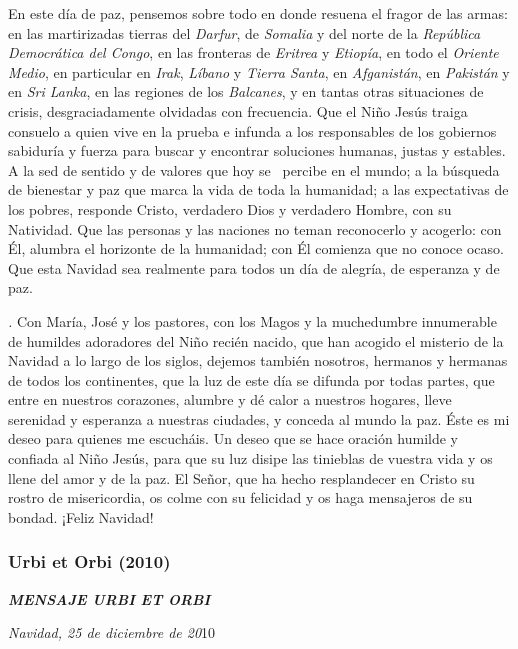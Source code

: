 En este día de paz, pensemos sobre todo en donde resuena el fragor de las armas: en las martirizadas tierras del \emph{Darfur}, de \emph{Somalia} y del norte de la \emph{República Democrática del Congo}, en las fronteras de \emph{Eritrea} y \emph{Etiopía}, en todo el \emph{Oriente Medio}, en particular en \emph{Irak}, \emph{Líbano} y \emph{Tierra Santa}, en \emph{Afganistán}, en \emph{Pakistán} y en \emph{Sri Lanka}, en las regiones de los \emph{Balcanes}, y en tantas otras situaciones de crisis, desgraciadamente olvidadas con frecuencia. Que el Niño Jesús traiga consuelo a quien vive en la prueba e infunda a los responsables de los gobiernos sabiduría y fuerza para buscar y encontrar soluciones humanas, justas y estables. A la sed de sentido y de valores que hoy se ~percibe en el mundo; a la búsqueda de bienestar y paz que marca la vida de toda la humanidad; a las expectativas de los pobres, responde Cristo, verdadero Dios y verdadero Hombre, con su Natividad. Que las personas y las naciones no teman reconocerlo y acogerlo: con Él,  alumbra el horizonte de la humanidad; con Él comienza  que no conoce ocaso. Que esta Navidad sea realmente para todos un día de alegría, de esperanza y de paz.

\emph{.} Con María, José y los pastores, con los Magos y la muchedumbre innumerable de humildes adoradores del Niño recién nacido, que han acogido el misterio de la Navidad a lo largo de los siglos, dejemos también nosotros, hermanos y hermanas de todos los continentes, que la luz de este día se difunda por todas partes, que entre en nuestros corazones, alumbre y dé calor a nuestros hogares, lleve serenidad y esperanza a nuestras ciudades, y conceda al mundo la paz. Éste es mi deseo para quienes me escucháis. Un deseo que se hace oración humilde y confiada al Niño Jesús, para que su luz disipe las tinieblas de vuestra vida y os llene del amor y de la paz. El Señor, que ha hecho resplandecer en Cristo su rostro de misericordia, os colme con su felicidad y os haga mensajeros de su bondad. ¡Feliz Navidad!

\subsubsection{Urbi et Orbi (2010)} \textbf{\emph{MENSAJE URBI ET ORBI}}

\emph{Navidad, 25 de diciembre de 20}10

~


